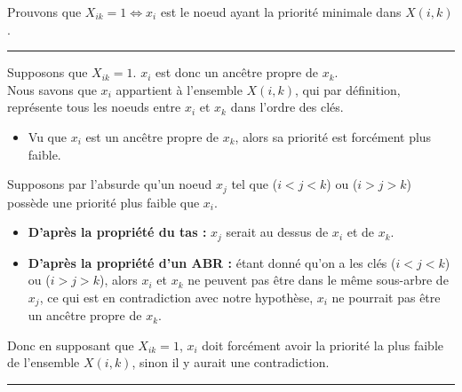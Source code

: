 \documentclass[a4paper,12pt]{report}
\begin{document}
\begin{tcolorbox}[colback=gray!10, colframe=blue!30, coltitle=black, title=Réponse à la 6.b - 1/1]

    Prouvons que \( X_{ik} = 1 \Longleftrightarrow x_i \) est le noeud ayant la priorité minimale dans \( X(i,k) \).

    \vspace{0.5cm}
    \hrule
    \vspace{0.5cm}

    Supposons que \( X_{ik} = 1 \). \( x_i \) est donc un ancêtre propre de \( x_k \).\\

    Nous savons que \( x_i \) appartient à l'ensemble \( X(i,k) \), qui par définition, représente tous les noeuds entre \( x_i \) et \( x_k \) dans
        l'ordre des clés.\\[-0.4cm]
    \begin{itemize}
        \item Vu que \( x_i \) est un ancêtre propre de \( x_k \), alors sa priorité est forcément plus faible.
    \end{itemize}

    \vspace{0.5cm}

    Supposons par l'absurde qu'un noeud \( x_j \) tel que (\( i < j < k \)) ou (\( i > j > k \)) possède une priorité plus faible que \( x_i \).\\[-0.4cm]
    \begin{itemize}
        \item \textbf{D'après la propriété du tas :} \( x_j \) serait au dessus de \( x_i \) et de \( x_k \).
        \item \textbf{D'après la propriété d'un ABR :} étant donné qu'on a les clés (\( i < j < k \)) ou (\( i > j > k \)), alors \( x_i \) et \( x_k \) ne peuvent pas être dans
            le même sous-arbre de \( x_j \), ce qui est en contradiction avec notre hypothèse, \( x_i \) ne pourrait pas être un ancêtre propre de \( x_k \).
    \end{itemize}

    \vspace{0.5cm}

    Donc en supposant que \( X_{ik} = 1 \), \( x_i \) doit forcément avoir la priorité la plus faible de l'ensemble \( X(i,k) \), sinon il y aurait une 
        contradiction.

    \vspace{0.5cm}
    \hrule
    \vspace{0.5cm}


\end{tcolorbox}
\end{document}

